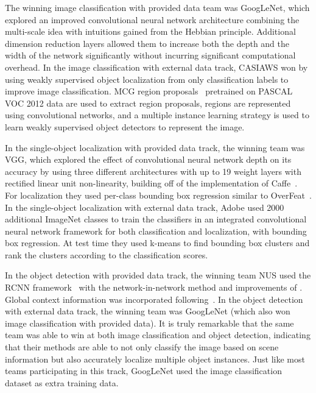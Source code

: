 \afterpage{
\begin{landscape}
\clearpage

\end{landscape}
}

\afterpage{
\begin{landscape}
\clearpage

\end{landscape}
}

\afterpage{
\begin{landscape}
\clearpage

\end{landscape}
}

The winning image classification with provided data team was GoogLeNet, which explored an improved convolutional neural network architecture combining the multi-scale idea with intuitions gained from the Hebbian principle. Additional dimension reduction layers allowed them to increase both the depth and the width of the network significantly without incurring significant computational overhead. In the image classification with external data track, CASIAWS won by using weakly supervised object localization from only classification labels to improve image classification. MCG region proposals~\citep{Arbelaez14} pretrained on PASCAL VOC 2012 data are used to extract region proposals, regions are represented using convolutional networks, and a multiple instance learning strategy is used to learn weakly supervised object detectors to represent the image.

 In the single-object localization with provided data track, the winning team was VGG, which explored the effect of convolutional neural network depth on its accuracy by using three different architectures with up to 19 weight layers with rectified linear unit non-linearity, building off of the implementation of Caffe~\citep{caffe}. For localization they used per-class bounding box regression similar to OverFeat~\citep{Sermanet13}. In the single-object localization with external data track, Adobe used 2000 additional ImageNet classes to train the classifiers in an integrated convolutional neural network framework for both classification and localization, with bounding box regression. At test time they used k-means to find bounding box clusters and rank the clusters according to the classification scores.

In the object detection with provided data track, the winning team  NUS used the RCNN framework~\citep{Girshick13} with the network-in-network method \citep{Lin14}  and improvements of \citep{Howard14}. Global context information was incorporated following~\citep{Chen14}. In the object detection with external data track, the winning team was GoogLeNet (which also won image classification with provided data). It is truly remarkable that the same team was able to win at both image classification and object detection, indicating that their methods are able to not only classify the image based on scene information but also accurately localize multiple object instances. Just like most teams participating in this track, GoogLeNet used the image classification dataset  as extra training data.




